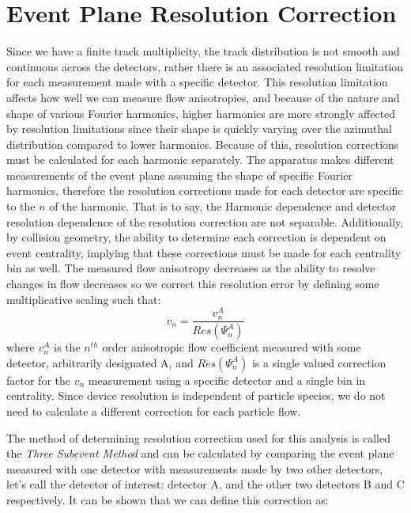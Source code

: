 \section{Event Plane Resolution Correction}
\label{sect:epres}
Since we have a finite track multiplicity, the track distribution is not smooth and continuous across the detectors, rather there is an associated resolution limitation for each measurement made with a specific detector. This resolution limitation affects how well we can measure flow anisotropies, and because of the nature and shape of various Fourier harmonics, higher harmonics are more strongly affected by resolution limitations since their shape is quickly varying over the azimuthal distribution compared to lower harmonics. Because of this, resolution corrections must be calculated for each harmonic separately. The apparatus makes different measurements of the event plane assuming the shape of specific Fourier harmonics, therefore the resolution corrections made for each detector are specific to the $n$ of the harmonic. That is to say, the Harmonic dependence and detector resolution dependence of the resolution correction are not separable. Additionally, by collision geometry, the ability to determine each correction is dependent on event centrality, implying that these corrections must be made for each centrality bin as well. The measured flow anisotropy decreases as the ability to resolve changes in flow decreases so we correct this resolution error by defining some multiplicative scaling such that:
\begin{equation}
v_n = \frac{v_n^{A}}{Res(\Psi_n^A)}
\end{equation}
where $v_n^{A}$ is the $n^{th}$ order anisotropic flow coefficient measured with some detector, arbitrarily designated A, and $Res(\Psi_n^A)$ is a single valued correction factor for the $v_n$ measurement using a specific detector and a single bin in centrality. Since device resolution is independent of particle species, we do not need to calculate a different correction for each particle flow. 

The method of determining resolution correction used for this analysis is called the \textit{Three Subevent Method} and can be calculated by comparing the event plane measured with one detector with measurements made by two other detectors, let's call the detector of interest: detector A, and the other two detectors B and C respectively. It can be shown \citep{PhysRevC.58.1671} that we can define this correction as:

